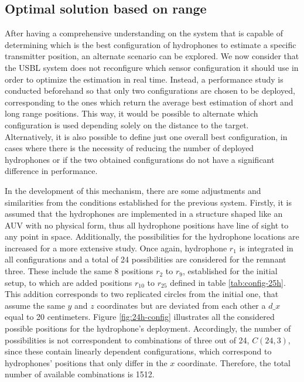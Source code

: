 \subsection{Optimal solution based on range} \label{subsec:opt-range}

After having a comprehensive understanding on the system that is capable of determining which is the best configuration of hydrophones to estimate a specific transmitter position, an alternate scenario can be explored. We now consider that the USBL system does not reconfigure which sensor configuration it should use in order to optimize the estimation  in real time. Instead, a performance study is conducted beforehand so that only two configurations are chosen to be deployed, corresponding to the ones which return the average best estimation of short and long range positions. This way, it would be possible to alternate which configuration is used depending solely on the distance to the target. Alternatively, it is also possible to define just one overall best configuration, in cases where there is the necessity of reducing the number of deployed hydrophones or if the two obtained configurations do not have a significant difference in performance.

In the development of this mechanism, there are some adjustments and similarities from the conditions established for the previous system. Firstly, it is assumed that the hydrophones are implemented in a structure shaped like an AUV with no physical form, thus all hydrophone positions have line of sight to any point in space. Additionally, the possibilities for the hydrophone locations are increased for a more extensive study. Once again, hydrophone $r_1$ is integrated in all configurations and a total of 24 possibilities are considered for the remnant three. These include the same 8 positions $r_2$ to $r_9$, established for the initial setup, to which are added positions $r_{10}$ to $r_{25}$ defined in table \ref{tab:config-25h}. This addition corresponds to two replicated circles from the initial one, that assume the same $y$ and $z$ coordinates but are deviated from each other a $d\_x$ equal to 20 centimeters. Figure \ref{fig:24h-config} illustrates all the considered possible positions for the hydrophone's deployment. Accordingly, the number of possibilities is not correspondent to combinations of three out of 24, $C(24,3)$, since these contain linearly dependent configurations, which correspond to hydrophones' positions that only differ in the $x$ coordinate. Therefore, the total number of available combinations is 1512.

